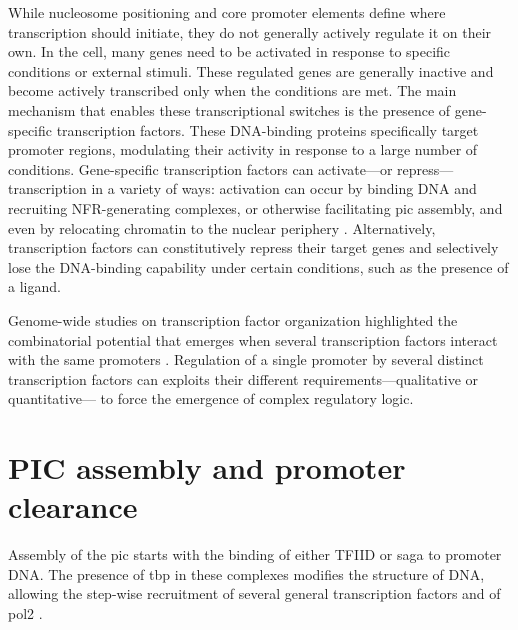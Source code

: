 While nucleosome positioning and core promoter elements define where transcription should initiate, they do not generally actively regulate it on their own.  
In the cell, many genes need to be activated in response to specific conditions or external stimuli.
These regulated genes are generally inactive and become actively transcribed only when the conditions are met.
The main mechanism that enables these transcriptional switches is the presence of gene-specific transcription factors.
These DNA-binding proteins specifically target promoter regions, modulating their activity in response to a large number of conditions.
Gene-specific transcription factors can activate---or repress---transcription in a variety of ways: activation can occur by binding DNA and recruiting NFR-generating complexes, or otherwise facilitating \gls{pic} assembly, and even by relocating chromatin to the nuclear periphery \citep{randisehinchliff:2016:transcription}.
Alternatively, transcription factors can constitutively repress their target genes and selectively lose the DNA-binding capability under certain conditions, such as the presence of a ligand.

Genome-wide studies on transcription factor organization highlighted the combinatorial potential that emerges when several transcription factors interact with the same promoters \cite{harbison:2004:transcriptional}.
Regulation of a single promoter by several distinct transcription factors can exploits their different requirements---qualitative or quantitative--- to force the emergence of complex regulatory logic.

\section{PIC assembly and promoter clearance}



Assembly of the \acrlong{pic} starts with the binding of either TFIID or \gls{saga} to promoter DNA.
The presence of \gls{tbp} in these complexes modifies the structure of DNA, allowing the step-wise recruitment of several general transcription factors and of \gls{pol2} \citep[For review see][]{sainsbury:2015:structural}.

